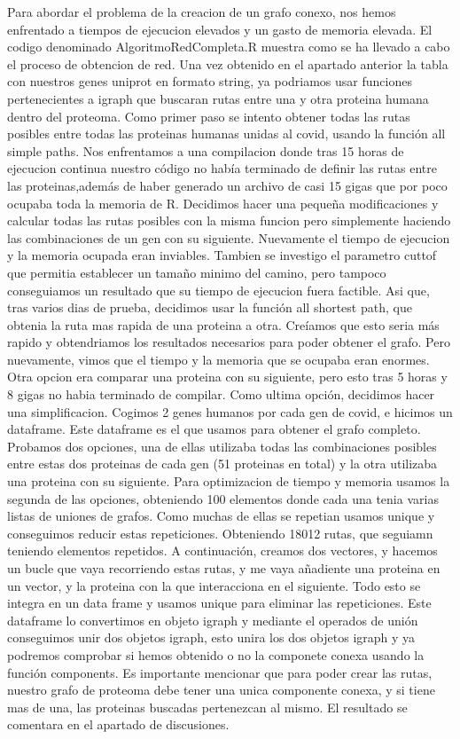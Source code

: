Para abordar el problema de la creacion de un grafo conexo, nos hemos enfrentado a tiempos de ejecucion elevados y un gasto de memoria elevada. 
El codigo denominado AlgoritmoRedCompleta.R muestra como se ha llevado a cabo el proceso de obtencion de red. 
Una vez obtenido en el apartado anterior la tabla con nuestros genes uniprot en formato string, ya podriamos usar funciones pertenecientes a igraph que buscaran rutas entre una y otra proteina humana dentro del proteoma. 
Como primer paso se intento obtener todas las rutas posibles entre todas las proteinas humanas unidas al covid, usando la función all simple paths. 
Nos enfrentamos a una compilacion donde tras 15 horas de ejecucion continua nuestro código no había terminado de definir las rutas entre las proteinas,además de haber generado un archivo de casi 15 gigas que por poco ocupaba toda la memoria de R. 
Decidimos hacer una pequeña modificaciones y calcular todas las rutas posibles con la misma funcion pero simplemente haciendo las combinaciones de un gen con su siguiente. Nuevamente el tiempo de ejecucion y la memoria ocupada eran inviables. 
Tambien se investigo el parametro cuttof que permitia establecer un tamaño minimo del camino, pero tampoco conseguiamos un resultado que su tiempo de ejecucion fuera factible. 
Asi que, tras varios dias de prueba, decidimos usar la función all shortest path, que obtenia la ruta mas rapida de una proteina a otra. Creíamos que esto seria más rapido y obtendriamos los resultados necesarios para poder obtener el grafo. Pero nuevamente, vimos que el tiempo y la memoria que se ocupaba eran enormes. Otra opcion era comparar una proteina con su siguiente, pero esto tras 5 horas y 8 gigas no habia terminado de compilar. 
Como ultima opción, decidimos hacer una simplificacion. Cogimos 2 genes humanos por cada gen de covid, e hicimos un dataframe. Este dataframe es el que usamos para obtener el grafo completo. 
Probamos dos opciones, una de ellas utilizaba todas las combinaciones posibles entre estas dos proteinas de cada gen (51 proteinas en total) y la otra utilizaba una proteina con su siguiente. Para optimizacion de tiempo y memoria usamos la segunda de las opciones, obteniendo 100 elementos donde cada una tenia varias listas de uniones de grafos. Como muchas de ellas se repetian usamos unique y conseguimos reducir estas repeticiones. Obteniendo 18012 rutas, que seguiamn teniendo elementos repetidos. A continuación, creamos dos vectores, y hacemos un bucle que vaya recorriendo estas rutas, y me vaya añadiente una proteina en un vector, y la proteina con la que interacciona en el siguiente. Todo esto se integra en un data frame y usamos unique para eliminar las repeticiones. 
Este dataframe lo convertimos en objeto igraph y mediante el operados de unión conseguimos unir dos objetos igraph, esto unira los dos objetos igraph y ya podremos comprobar si hemos obtenido o no la componete conexa usando la función components. Es importante mencionar que para poder crear las rutas, nuestro grafo de proteoma debe tener una unica componente conexa, y si tiene mas de una, las proteinas buscadas pertenezcan al mismo. El resultado se comentara en el apartado de discusiones. 

